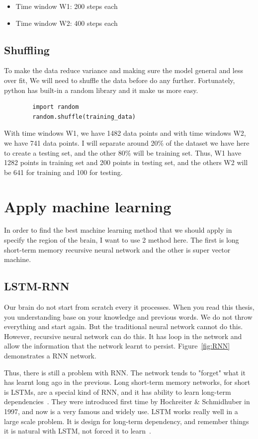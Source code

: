      \begin{itemize}
          \item Time window W1: 200 steps each
          \item Time window W2: 400 steps each
      \end{itemize}
      
      \subsection{Shuffling}
        To make the data reduce variance and making sure the model general and less over fit, We will need to shuffle the data before do any further. Fortunately, python has built-in a random library and it make us more easy.
        
        \begin{lstlisting}
        import random
        random.shuffle(training_data)
        \end{lstlisting}
        
        With time windows W1, we have 1482 data points and with time windows W2, we have 741 data points. I will separate around 20\% of the dataset we have here to create a testing set, and the other 80\% will be training set. Thus, W1 have 1282 points in training set and 200 points in testing set, and the others W2 will be 641 for training and 100 for testing.
            
\section{Apply machine learning}
    In order to find the best machine learning method that we should apply in specify the region of the brain, I want to use 2 method here. The first is long short-term memory recursive neural network and the other is super vector machine.
    \subsection{LSTM-RNN}
    Our brain do not start from scratch every it processes. When you read this thesis, you understanding base on your knowledge and previous words. We do not throw everything and start again. But the traditional neural network cannot do this. However, recursive neural network can do this. It has loop in the network and allow the information that the network learnt to persist. Figure~\ref{fig:RNN} demonstrates a RNN network.
    
    Thus, there is still a problem with RNN. The network tends to "forget" what it has learnt long ago in the previous. Long short-term memory networks, for short is LSTMs, are a special kind of RNN, and it has ability to learn long-term dependencies~\cite{NeuralNetwork}. They were introduced first time by Hochreiter \& Schmidhuber in 1997, and now is a very famous and widely use. LSTM works really well in a large scale problem. It is design for long-term dependency, and remember things it is natural with LSTM, not forced it to learn~\cite{LSTM}.
    
